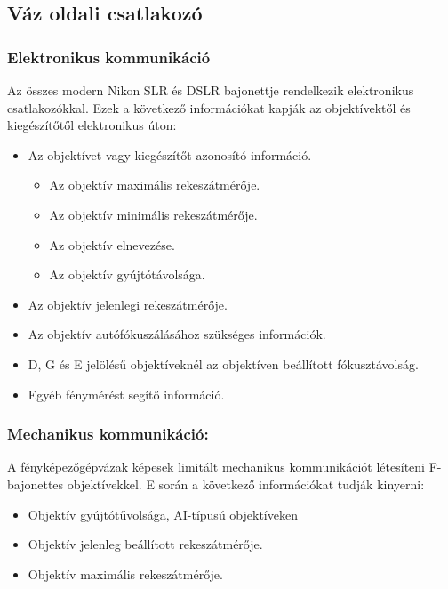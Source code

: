 \subsection{Váz oldali csatlakozó}
\subsubsection{Elektronikus kommunikáció}
Az összes modern Nikon SLR és DSLR bajonettje rendelkezik elektronikus csatlakozókkal. Ezek a következő információkat kapják az objektívektől és kiegészítőtől elektronikus úton:
\begin{itemize}
    \item Az objektívet vagy kiegészítőt azonosító információ.
    \begin{itemize}
        \item Az objektív maximális rekeszátmérője.
        \item Az objektív minimális rekeszátmérője.
        \item Az objektív elnevezése.
        \item Az objektív gyújtótávolsága.%
    \end{itemize}
    \item Az objektív jelenlegi rekeszátmérője.
    \item Az objektív autófókuszálásához szükséges információk.
    \item D, G és E jelölésű objektíveknél az objektíven beállított fókusztávolság.
    \item Egyéb fénymérést segítő információ.
\end{itemize}

\subsubsection{Mechanikus kommunikáció:}
A fényképezőgépvázak képesek limitált mechanikus kommunikációt létesíteni F-bajonettes objektívekkel. E során a következő információkat tudják kinyerni:
\begin{itemize}
    \item Objektív gyújtótűvolsága, AI-típusú objektíveken %
    \item Objektív jelenleg beállított rekeszátmérője. \cite{Lens_naming}
    \item Objektív maximális rekeszátmérője. \cite{Lens_naming}
\end{itemize}

